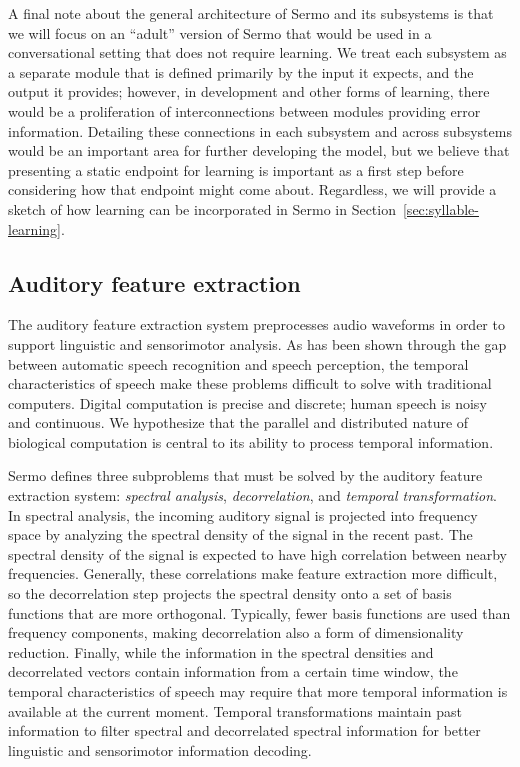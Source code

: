 A final note about
the general architecture of Sermo
and its subsystems
is that we will focus on an
``adult'' version of Sermo
that would be used in a conversational setting
that does not require learning.
We treat each subsystem as a separate
module that is defined primarily
by the input it expects,
and the output it provides;
however, in development
and other forms of learning,
there would be a proliferation of
interconnections between modules
providing error information.
Detailing these connections
in each subsystem and across subsystems
would be an important area
for further developing the model,
but we believe that presenting
a static endpoint for learning
is important as a first step
before considering
how that endpoint might come about.
Regardless, we will provide a sketch of
how learning can be incorporated in Sermo
in Section~\ref{sec:syllable-learning}.

\subsection{Auditory feature extraction}
\label{sec:model-ncc}


The auditory feature extraction system
preprocesses audio waveforms
in order to support
linguistic and sensorimotor analysis.
As has been shown through
the gap between
automatic speech recognition
and speech perception,
the temporal characteristics
of speech
make these problems
difficult to solve
with traditional computers.
Digital computation is precise and discrete;
human speech is noisy and continuous.
We hypothesize that the
parallel and distributed nature
of biological computation
is central to its
ability to process temporal information.

Sermo defines three subproblems
that must be solved
by the auditory feature extraction system:
\textit{spectral analysis},
\textit{decorrelation},
and \textit{temporal transformation}.
In spectral analysis,
the incoming auditory signal
is projected into frequency space
by analyzing the spectral density
of the signal in the recent past.
The spectral density of the signal
is expected to have high
correlation between nearby frequencies.
Generally, these correlations
make feature extraction more difficult,
so the decorrelation step
projects the spectral density
onto a set of basis functions
that are more orthogonal.
Typically, fewer basis functions
are used than frequency components,
making decorrelation also a form
of dimensionality reduction.
Finally, while the information
in the spectral densities
and decorrelated vectors
contain information from
a certain time window,
the temporal characteristics of speech
may require that more
temporal information is available
at the current moment.
Temporal transformations
maintain past information
to filter spectral
and decorrelated spectral information
for better linguistic
and sensorimotor information decoding.

